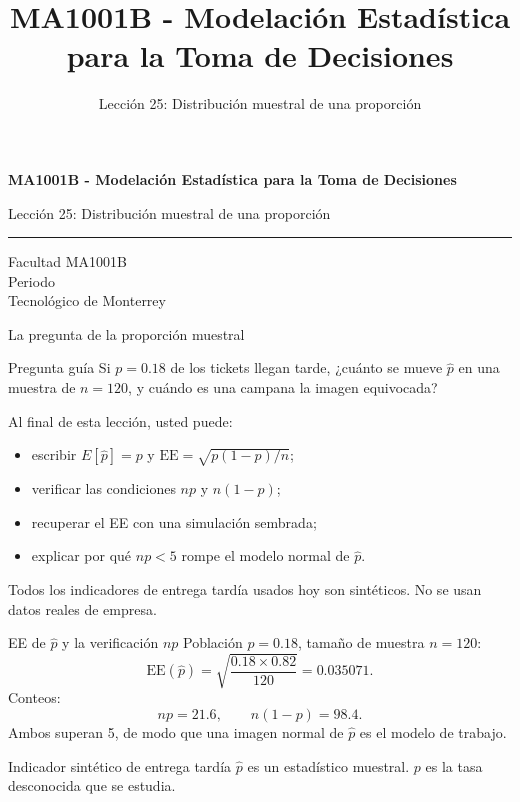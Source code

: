 \documentclass[aspectratio=169,10pt,spanish]{beamer}
\title{MA1001B - Modelación Estadística para la Toma de Decisiones}
\subtitle{Lección 25: Distribución muestral de una proporción}
\author{}
\institute{Tecnol\'ogico de Monterrey}
\date{}
\begin{document}
\begin{frame}[plain]
  \vspace{1.2cm}
  {\Large\bfseries MA1001B - Modelación Estadística para la Toma de Decisiones\par}
  \vspace{0.7cm}
  {\large Lección 25: Distribución muestral de una proporción\par}
  \vspace{0.7cm}
  {\color{TecRojo}\rule{\textwidth}{1.2pt}}
  \vspace{0.8cm}

  Facultad MA1001B\\[0.3cm]
  Periodo\\[0.3cm]
  Tecnol\'ogico de Monterrey
\end{frame}

\begin{frame}{La pregunta de la proporción muestral}
  \begin{alertblock}{Pregunta guía}
    Si $p=0.18$ de los tickets llegan tarde, ¿cuánto se mueve $\hat p$ en
    una muestra de $n=120$, y cuándo es una campana la imagen equivocada?
  \end{alertblock}

  \vspace{0.6em}
  Al final de esta lección, usted puede:
  \begin{itemize}
    \item escribir $E[\hat p]=p$ y $\mathrm{EE}=\sqrt{p(1-p)/n}$;
    \item verificar las condiciones $np$ y $n(1-p)$;
    \item recuperar el EE con una simulación sembrada;
    \item explicar por qué $np<5$ rompe el modelo normal de $\hat p$.
  \end{itemize}

  \vfill
  \scriptsize Todos los indicadores de entrega tardía usados hoy son sintéticos. No se usan datos reales de empresa.
\end{frame}

\begin{frame}{EE de $\hat p$ y la verificación $np$}
  \small
  Población $p=0.18$, tamaño de muestra $n=120$:
  \[
    \mathrm{EE}(\hat p)=\sqrt{\frac{0.18\times 0.82}{120}}=0.035071.
  \]
  Conteos:
  \[
    np=21.6,\qquad n(1-p)=98.4.
  \]
  Ambos superan 5, de modo que una imagen normal de $\hat p$ es el modelo
  de trabajo.

  \vspace{0.3em}
  \begin{exampleblock}{Indicador sintético de entrega tardía}
    $\hat p$ es un estadístico muestral. $p$ es la tasa desconocida que se
    estudia.
  \end{exampleblock}
\end{frame}
\end{document}
